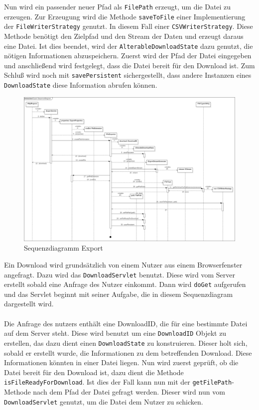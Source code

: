 {{{{{Nun wird ein passender neuer Pfad als \texttt{FilePath} erzeugt, um die Datei zu erzeugen. Zur Erzeugung wird die Methode \texttt{saveToFile} einer Implementierung der \texttt{FileWriterStrategy} genutzt. In diesem Fall einer \texttt{CSVWriterStrategy}. Diese Methode benötigt den Zielpfad und den Stream der Daten und erzeugt daraus eine Datei. Ist dies beendet, wird der \texttt{AlterableDownloadState} dazu genutzt, die nötigen Informationen abzuspeichern. Zuerst wird der Pfad der Datei eingegeben und anschließend wird festgelegt, dass die Datei bereit für den Download ist. Zum Schluß wird noch mit \texttt{savePersistent} sichergestellt, dass andere Instanzen eines \texttt{DownloadState} diese Information abrufen können.
\begin{figure}[!hbp]
	\centering
	\includegraphics[width=1.25\linewidth,angle=90]{images/export/ExportSequenceDiagram.png}
	\caption{Sequenzdiagramm Export}
\end{figure}
\newpage
Ein Download wird grundsätzlich von einem Nutzer aus einem Browserfenster angefragt. Dazu wird das \texttt{DownloadServlet} benutzt. Diese wird vom Server erstellt sobald eine Anfrage des Nutzer einkommt. Dann wird \texttt{doGet} aufgerufen und das Servlet beginnt mit seiner Aufgabe, die in diesem Sequenzdiagram dargestellt wird.\\\\
Die Anfrage des nutzers enthält eine DownloadID, die für eine bestimmte Datei auf dem Server steht. Diese wird benutzt um eine \texttt{DownloadID} Objekt zu erstellen, das dazu dient einen \texttt{DownloadState} zu konstruieren. Dieser holt sich, sobald er erstellt wurde, die Informationen zu dem betreffenden Download. Diese Informationen könnten in einer Datei liegen. Nun wird zuerst geprüft, ob die Datei bereit für den Download ist, dazu dient die Methode \texttt{isFileReadyForDownload}. Ist dies der Fall kann nun mit der \texttt{getFilePath}-Methode nach dem Pfad der Datei gefragt werden. Dieser wird nun vom \texttt{DownloadServlet} genutzt, um die Datei dem Nutzer zu schicken.\\\\
}}}}}
